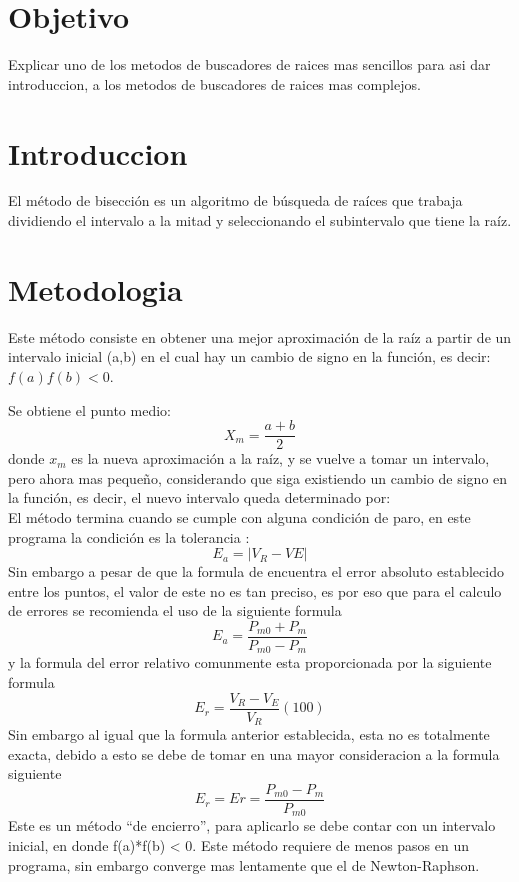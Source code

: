 \documentclass{article}
\begin{document}
\begin{multicols}{2}
\section{Objetivo}
\label{sec:Obj}
Explicar uno de los metodos de buscadores de raices mas sencillos para asi dar introduccion, a los metodos de buscadores de raices mas complejos. 

\section{Introduccion}
\label{sec:Intro}
El método de bisección es un algoritmo de búsqueda de raíces que trabaja dividiendo el intervalo a la mitad y seleccionando el subintervalo que tiene la raíz.
\section{Metodologia}
\label{sec:Met}
Este método consiste en obtener una mejor aproximación de la raíz a partir de un intervalo inicial (a,b) en el cual hay un cambio de signo en la función, es decir: $f(a)f(b)<0$.

Se obtiene el punto medio:
\begin{equation}
X_{m}=\frac{a+b}{2}
\end{equation}
donde $x_{m}$ es la nueva aproximación a  la raíz, y se vuelve a tomar un intervalo, pero ahora mas pequeño, considerando que siga existiendo un cambio de signo en la función, es decir, el nuevo intervalo queda determinado por:
\\
El método termina cuando se cumple con alguna condición de paro, en este programa la condición es la tolerancia :
\\
\begin{equation}
E_{a}=|V_{R}-V{E}|
\end{equation}
Sin embargo a pesar de que la formula de encuentra el error absoluto establecido entre los puntos, el valor de este no es tan preciso, es por eso que para el calculo de errores se recomienda el uso de la siguiente formula
\begin{equation}
E_{a}=\frac{P_{m0}+P_{m}}{P_{m0}-P_{m}}
\end{equation}
y la formula del error relativo comunmente esta proporcionada por la siguiente formula 
\begin{equation}
E_{r}=\frac{V_{R}-V_{E}}{V_{R}} (100)
\end{equation}
Sin embargo al igual que la formula anterior establecida, esta no es totalmente exacta, debido a esto se debe de tomar en una mayor consideracion a la formula siguiente
\begin{equation}
E_{r}=Er=\frac{P_{m0}-P_{m}}{P_{m0}}
\end{equation}
Este es un método “de encierro”, para aplicarlo se debe contar con un intervalo inicial, en donde f(a)*f(b) < 0. Este método requiere de menos pasos en un programa, sin embargo converge mas lentamente que el de Newton-Raphson.


\end{multicols}
\end{document}
